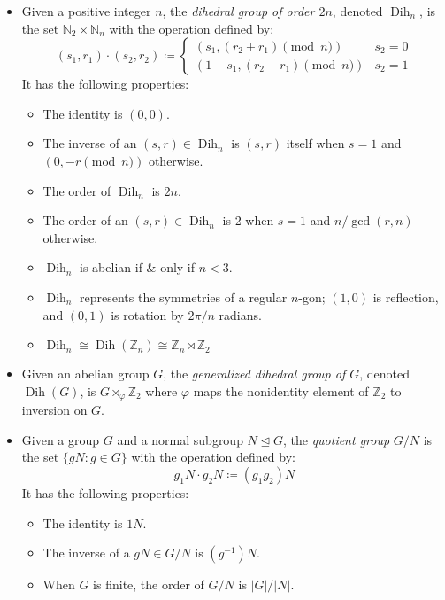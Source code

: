 \documentclass{article}
\newcommand{\N}{\mathbb{N}}
\newcommand{\Z}{\mathbb{Z}}
\DeclareMathOperator{\Dih}{Dih}
\newcommand{\normaleq}{\trianglelefteq}
\begin{document}
\begin{itemize}
\item Given a positive integer $n$, the \emph{dihedral group of order $2n$}, denoted $\Dih_n$, is the set $\N_2\times\N_n$ with the operation defined by: $$(s_1, r_1)\cdot(s_2, r_2)\coloneqq \begin{cases}(s_1, (r_2 + r_1)\pmod{n}) & s_2 = 0 \\ (1-s_1, (r_2 - r_1)\pmod{n}) & s_2 = 1\end{cases}$$  It has the following properties:
 \begin{itemize}
 \item The identity is $(0,0)$.
 \item The inverse of an $(s,r)\in\Dih_n$ is $(s,r)$ itself when $s=1$ and $(0, -r\pmod{n})$ otherwise.
 \item The order of $\Dih_n$ is $2n$.
 \item The order of an $(s,r)\in\Dih_n$ is 2 when $s=1$ and $n/\gcd(r,n)$ otherwise.
 \item $\Dih_n$ is abelian if \& only if $n<3$.
 \item $\Dih_n$ represents the symmetries of a regular $n$-gon; $(1,0)$ is reflection, and $(0,1)$ is rotation by $2\pi/n$ radians.
 \item $\Dih_n \cong \Dih(\Z_n) \cong \Z_n\rtimes\Z_2$
 \end{itemize}
\item Given an abelian group $G$, the \emph{generalized dihedral group of $G$}, denoted $\Dih(G)$, is $G\rtimes_\varphi\Z_2$ where $\varphi$ maps the nonidentity element of $\Z_2$ to inversion on $G$.

\item Given a group $G$ and a normal subgroup $N\normaleq G$, the \emph{quotient group} $G/N$ is the set $\{gN : g\in G\}$ with the operation defined by: $$g_1N \cdot g_2N \coloneqq (g_1g_2)N$$  It has the following properties:
 \begin{itemize}
 \item The identity is $1N$.
 \item The inverse of a $gN\in G/N$ is $(g^{-1})N$.
 \item When $G$ is finite, the order of $G/N$ is $|G|/|N|$.
 \end{itemize}


\end{itemize}
\end{document}
